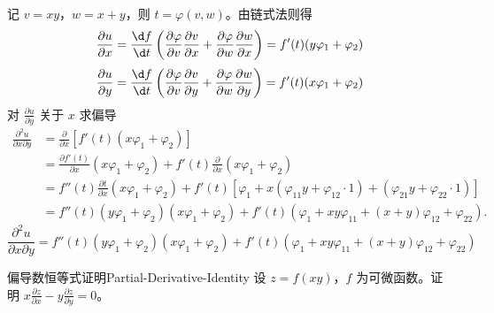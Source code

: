 \begin{solution}
    记 $v = xy$，$w = x + y$，则 $t = \varphi(v, w)$。由链式法则得
    \begin{equation}
        \frac{\partial u}{\partial x} = \frac{\d f}{\d t} \left( \frac{\partial \varphi}{\partial v} \frac{\partial v}{\partial x} + \frac{\partial \varphi}{\partial w} \frac{\partial w}{\partial x} \right) = f'(t) (y \varphi_1 + \varphi_2)
    \end{equation}
    \begin{equation}
        \frac{\partial u}{\partial y} = \frac{\d f}{\d t} \left( \frac{\partial \varphi}{\partial v} \frac{\partial v}{\partial y} + \frac{\partial \varphi}{\partial w} \frac{\partial w}{\partial y} \right) = f'(t) (x \varphi_1 + \varphi_2)
    \end{equation}
    对 $\frac{\partial u}{\partial y}$ 关于 $x$ 求偏导
    \begin{equation}
        \begin{aligned}
            \frac{\partial^2 u}{\partial x \partial y} & = \frac{\partial}{\partial x} [f'(t) (x \varphi_1 + \varphi_2)]                                                                                                            \\
                                                       & = \frac{\partial f'(t)}{\partial x} (x \varphi_1 + \varphi_2) + f'(t) \frac{\partial}{\partial x} (x \varphi_1 + \varphi_2)                                                \\
                                                       & = f''(t) \frac{\partial t}{\partial x} (x \varphi_1 + \varphi_2) + f'(t) [\varphi_1 + x (\varphi_{11} y + \varphi_{12} \cdot 1) + (\varphi_{21} y + \varphi_{22} \cdot 1)] \\
                                                       & = f''(t) (y \varphi_1 + \varphi_2) (x \varphi_1 + \varphi_2) + f'(t) (\varphi_1 + xy \varphi_{11} + (x + y) \varphi_{12} + \varphi_{22}).
        \end{aligned}
    \end{equation}
    \begin{equation}
        \boxed{\frac{\partial^2 u}{\partial x \partial y} = f''(t) (y \varphi_1 + \varphi_2) (x \varphi_1 + \varphi_2) + f'(t) (\varphi_1 + xy \varphi_{11} + (x + y) \varphi_{12} + \varphi_{22})}
    \end{equation}
\end{solution}

\begin{problem}{偏导数恒等式证明}{Partial-Derivative-Identity}
    设 $z = f(xy)$，$f$ 为可微函数。证明 $x \frac{\partial z}{\partial x} - y \frac{\partial z}{\partial y} = 0$。
\end{problem}

